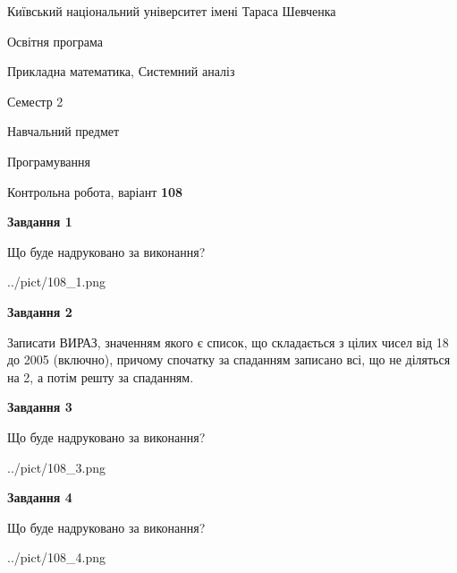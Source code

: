 \documentclass[12pt, ukrainian]{article}
\begin{document}
{{\begin {small}\par
{ \center  Київський національний університет імені Тараса Шевченка \par}
{\parbox {5 cm}{Освітня програма \hfill}{\parbox {8 cm}{Прикладна математика, Системний аналіз \hfill}}\parbox {5 cm}{\hfill Семестр 2}}\par
{\parbox {5 cm} {Навчальний предмет \hfill}\parbox {7 cm}{Програмування \hfill}\parbox {6cm}{\hfill}\par}\vspace{-7pt} \end{small}}{\center Контрольна робота, варіант  \No \textbf
{ 108 }\par}}
{
\begin {large}
{\begin {center}\textbf{Завдання 1}\end {center}}\par
Що буде надруковано за виконання?\par\par
\begin{center}
	{../pict/108_1.png}
\end{center}
\newpage

{\begin {center}\textbf{Завдання 2}\end {center}}\par

Записати ВИРАЗ, значенням якого є список, що складається з цілих чисел від 18 до 2005 (включно), причому спочатку за спаданням записано всі, що не діляться на 2, а потім решту за спаданням.\par
\newpage

{\begin {center}\textbf{Завдання 3}\end {center}}\par
Що буде надруковано за виконання?\par
\begin{center}
	{../pict/108_3.png}
\end{center}
\newpage

{\begin {center}\textbf{Завдання 4}\end {center}}\par
Що буде надруковано за виконання?\par
\begin{center}
	{../pict/108_4.png}
\end{center}
\newpage


\end{large}}
\end{document}
